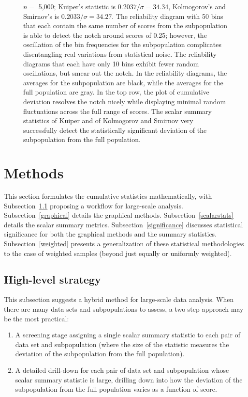 \documentclass{article}
\begin{document}
\begin{figure}
\begin{centering}
\end{centering}
\caption{$n =$ 5,000;
         Kuiper's statistic is $0.2037 / \sigma = 34.34$,
         Kolmogorov's and Smirnov's is $0.2033 / \sigma = 34.27$.
The reliability diagram with 50 bins
that each contain the same number of scores from the subpopulation
is able to detect the notch around scores of 0.25;
however, the oscillation of the bin frequencies
for the subpopulation complicates disentangling real variations
from statistical noise. The reliability diagrams that each have only 10 bins
exhibit fewer random oscillations, but smear out the notch.
In the reliability diagrams, the averages for the subpopulation are black,
while the averages for the full population are gray.
In the top row, the plot of cumulative deviation resolves the notch nicely
while displaying minimal random fluctuations across the full range of scores.
The scalar summary statistics of Kuiper and of Kolmogorov and Smirnov
very successfully detect the statistically significant deviation
of the subpopulation from the full population.
}
\label{5000}
\end{figure}



\section{Methods}
\label{methods}

This section formulates the cumulative statistics mathematically,
with Subsection~\ref{high-level} proposing a workflow for large-scale analysis.
Subsection~\ref{graphical} details the graphical methods.
Subsection~\ref{scalarstats} details the scalar summary metrics.
Subsection~\ref{significance} discusses statistical significance
for both the graphical methods and the summary statistics.
Subsection~\ref{weighted} presents a generalization
of these statistical methodologies to the case of weighted samples
(beyond just equally or uniformly weighted).


\subsection{High-level strategy}
\label{high-level}

This subsection suggests a hybrid method for large-scale data analysis.
When there are many data sets and subpopulations to assess,
a two-step approach may be the most practical:
%
\begin{enumerate}
\item A screening stage assigning a single scalar summary statistic
to each pair of data set and subpopulation (where the size of the statistic
measures the deviation of the subpopulation from the full population).
\item A detailed drill-down for each pair of data set and subpopulation
whose scalar summary statistic is large, drilling down into how the deviation
of the subpopulation from the full population varies as a function of score.
\end{enumerate}
\end{document}
